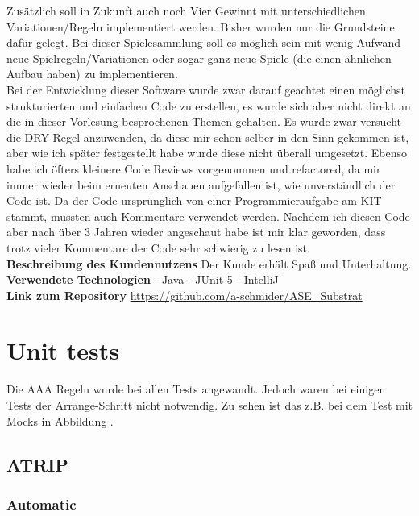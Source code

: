 \documentclass[12pt]{article}
\begin{document}
Zusätzlich soll in Zukunft auch noch Vier Gewinnt mit unterschiedlichen Variationen/Regeln implementiert werden. Bisher wurden nur die Grundsteine dafür gelegt. Bei dieser Spielesammlung soll es möglich sein mit wenig Aufwand neue Spielregeln/Variationen oder sogar ganz neue Spiele (die einen ähnlichen Aufbau haben) zu implementieren.
\\

Bei der Entwicklung dieser Software wurde zwar darauf geachtet einen möglichst strukturierten und einfachen Code zu erstellen,
es wurde sich aber nicht direkt an die in dieser Vorlesung besprochenen Themen gehalten. Es wurde zwar versucht die DRY-Regel anzuwenden, 
da diese mir schon selber in den Sinn gekommen ist, aber wie ich später festgestellt habe wurde diese nicht überall umgesetzt. Ebenso habe ich öfters kleinere Code Reviews vorgenommen und refactored, da mir immer wieder beim erneuten Anschauen aufgefallen ist, wie unverständlich der Code ist. Da der Code ursprünglich von einer Programmieraufgabe am KIT stammt, mussten auch Kommentare verwendet werden. Nachdem ich diesen Code aber nach über 3 Jahren wieder angeschaut habe ist mir klar geworden, dass trotz vieler Kommentare der Code sehr schwierig zu lesen ist.
\\ 

\noindent  \textbf{Beschreibung des Kundennutzens}
Der Kunde erhält Spaß und Unterhaltung.
\\

\noindent \textbf{Verwendete Technologien}
- Java
- JUnit 5
- IntelliJ
\\

\noindent \textbf{Link zum Repository}
\url{https://github.com/a-schmider/ASE_Substrat}





\newpage
\section{Unit tests}
Die AAA Regeln wurde bei allen Tests angewandt. Jedoch waren bei einigen Tests der Arrange-Schritt nicht notwendig. Zu sehen ist das z.B. bei dem Test mit Mocks in Abbildung \pageref{fig:Mock} .
\\

\subsection{ATRIP}

\subsubsection{Automatic}
\end{document}

